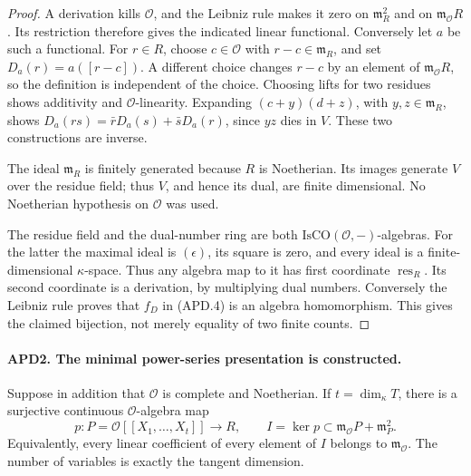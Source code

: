 \documentclass[11pt,a4paper]{article}
\numberwithin{equation}{section}
\theoremstyle{remark}\newtheorem{remark}[theorem]{Remark}
\begin{document}
\begin{proof}
A derivation kills \(\mathcal O\), and the Leibniz rule makes it
zero on \(\mathfrak m_R^2\) and on
\(\mathfrak m_{\mathcal O}R\).  Its restriction therefore gives
the indicated linear functional.  Conversely let \(a\) be such
a functional.  For \(r\in R\), choose \(c\in\mathcal O\)
with \(r-c\in\mathfrak m_R\), and set
\(D_a(r)=a([r-c])\).  A different choice changes \(r-c\) by an
element of \(\mathfrak m_{\mathcal O}R\), so the definition is
independent of the choice.  Choosing lifts for two residues shows
additivity and \(\mathcal O\)-linearity.  Expanding
\((c+y)(d+z)\), with \(y,z\in\mathfrak m_R\), shows
\(D_a(rs)=\bar rD_a(s)+\bar sD_a(r)\), since \(yz\) dies in
\(V\).  These two constructions are inverse.

The ideal \(\mathfrak m_R\) is finitely generated because \(R\)
is Noetherian.  Its images generate \(V\) over the residue field;
thus \(V\), and hence its dual, are finite dimensional.  No
Noetherian hypothesis on \(\mathcal O\) was used.

The residue field and the dual-number ring are both
\(\mathrm{IsCO}(\mathcal O,-)\)-algebras.  For the latter the
maximal ideal is \((\epsilon)\), its square is zero, and every
ideal is a finite-dimensional \(\kappa\)-space.  Thus any algebra
map to it has first coordinate \(\operatorname{res}_R\).
Its second coordinate is a derivation, by multiplying dual numbers.
Conversely the Leibniz rule proves that \(f_D\) in (APD.4) is
an algebra homomorphism.  This gives the claimed bijection, not
merely equality of two finite counts.
\end{proof}

\paragraph{APD2. The minimal power-series presentation is constructed.}
\label{claim:APD2}
Suppose in addition that \(\mathcal O\) is complete and
Noetherian.  If \(t=\dim_\kappa T\), there is a surjective
continuous \(\mathcal O\)-algebra map
\[
 p:P=\mathcal O[[X_1,\ldots,X_t]]\longrightarrow R,
 \qquad I=\ker p\subset
        \mathfrak m_{\mathcal O}P+\mathfrak m_P^2.             \tag{APD.5}
\]
Equivalently, every linear coefficient of every element of \(I\)
belongs to \(\mathfrak m_{\mathcal O}\).  The number of variables
is exactly the tangent dimension.
\end{document}
